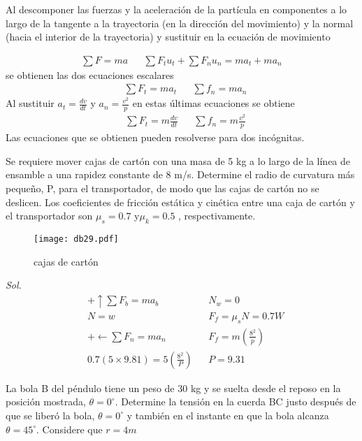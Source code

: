 Al descomponer las fuerzas y la aceleración de la partícula en componentes a lo largo de la tangente a la trayectoria (en la dirección del movimiento) y la normal (hacia el interior de la trayectoria) y sustituir en la ecuación de movimiento

\begin{align*}
    \sum F=ma&&\sum F_tu_t+\sum F_nu_n=ma_t+ma_n
\end{align*}
se obtienen las dos ecuaciones escalares
\begin{align*}
    &\sum F_t=ma_t&&\sum f_n=ma_n
\end{align*}
Al sustituir $a_t=\frac{dv}{dt}$ y $a_n=\frac{v^2}{p}$ en estas últimas ecuaciones se obtiene
\begin{align*}
    &\sum F_t=m\frac{dv}{dt}&&\sum f_n=m\frac{v^2}{p}
\end{align*}
Las ecuaciones que se obtienen pueden resolverse para dos incógnitas.

\begin{example}
    Se requiere mover cajas de cartón con una masa de 5 kg a lo largo de la línea de ensamble a una rapidez constante de 8 m/s. Determine el radio de curvatura más pequeño, P, para el transportador, de modo que las cajas de cartón no se deslicen. Los coeficientes de fricción estática y cinética entre una caja de cartón y el transportador son $\mu_s= 0.7$ y$ \mu_k= 0.5$ , respectivamente.
\end{example}
\begin{figure}[h!]
\centering
  \texttt{[image: db29.pdf]}
  \caption{cajas de cartón}
  \label{db29}
\end{figure}

\textit{ Sol. }
\begin{align*}
    &+\uparrow \sum F_b=ma_b&&N_w=0\\
    &N=w&&F_f=\mu_sN=0.7W\\
    &+\leftarrow \sum F_n=ma_n&&F_f=m\left(\frac{8^2}{p}\right)\\
    &0.7(5\times 9.81)=5\left(\frac{8^2}{P}\right)&&P=9.31
\end{align*}

\begin{example}
    La bola B del péndulo tiene un peso de 30 kg y se suelta desde el reposo en la posición mostrada, $\theta= 0^{\circ}$. Determine la tensión en la cuerda BC justo después de que se liberó la bola, $\theta=0^{\circ}$ y también en el instante en que la bola alcanza $\theta= 45^{\circ}$. Considere que $r= 4 m$
\end{example}


